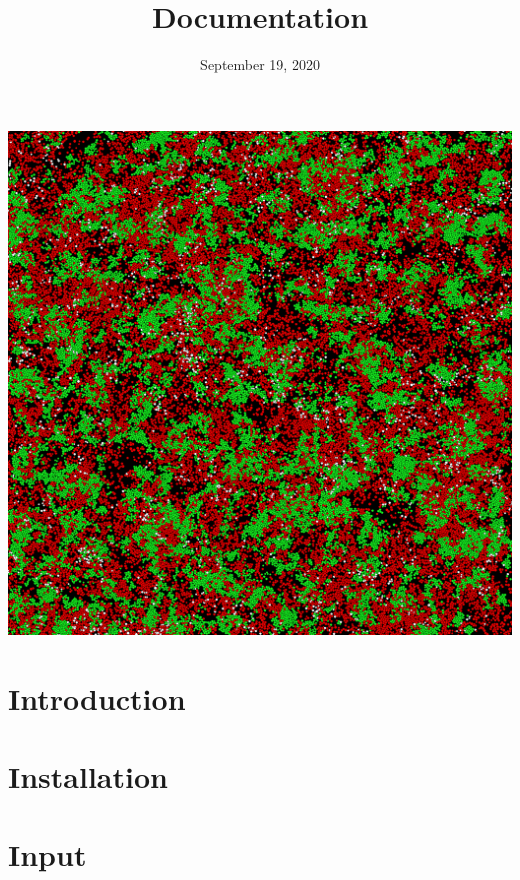 \documentclass[12pt]{article}
\begin{document}
    \title{\vspace{0mm}\textbf{Documentation}}
    \date{\vspace{-10mm}September 19, 2020}
    \maketitle

\begin{center}
    \includegraphics[width=15cm]{../images/front_page.png}
\end{center}

\newpage

\tableofcontents

\newpage

    \section{Introduction}\label{sec:intro}

    \section{Installation}\label{sec:install}

    \section{Input}
\end{document}
